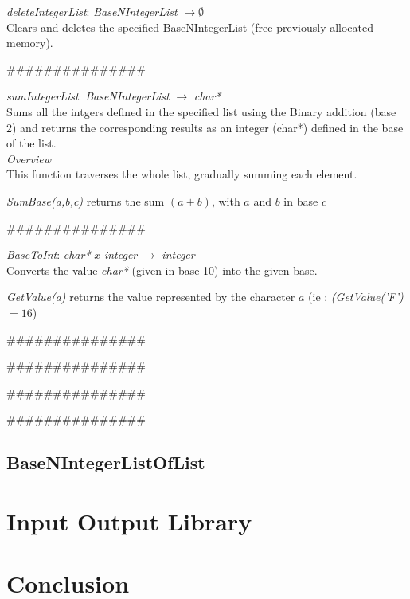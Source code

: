 \documentclass[book, backcover, english, report, nodocumentinfo]{upmethodology-document}
\newcommand{\nxtalgo}{\centerline{$$$$\#\#\#\#\#\#\#\#\#\#\#\#\#\#\#$$$$}}
\newcommand{\ov}{\emph{Overview}}
\begin{document}
		\begin{minipage}{\linewidth}
			\emph{deleteIntegerList}: \emph{BaseNIntegerList} \(\rightarrow \emptyset\)\\
				Clears and deletes the specified BaseNIntegerList (free previously allocated memory).\\
			\label{algo:BNIL-DeleteIntegerList}
			
		\end{minipage}
		\nxtalgo

		\begin{minipage}{\linewidth}
			\emph{sumIntegerList}: \emph{BaseNIntegerList} \(\rightarrow\) \emph{char*}\\
				Sums all the intgers defined in the specified list using the Binary addition (base 2)
				and returns the corresponding results as an integer (char*) defined in the base of the list.\\
			\ov\\
			This function traverses the whole list, gradually summing each element.
			\label{algo:BNIL-SumIntegerList}
			
			\emph{SumBase(a,b,c)} returns the sum \((a+b)\), with \(a\) and \(b\) in base \(c\)
		\end{minipage}
		\nxtalgo

		\begin{minipage}{\linewidth}
			\emph{BaseToInt}: \emph{char*} \(x\) \emph{integer} \(\rightarrow\) \emph{integer}\\
				Converts the value \emph{char*} (given in base 10) into the given base.
			\label{algo:BNIL-BaseToInt}
			
			\emph{GetValue(a)} returns the value represented by the character \(a\)
			(ie : \emph{(GetValue('F')} \(= 16\))
		\end{minipage}
		\nxtalgo

		\begin{minipage}{\linewidth}
			\label{algo:BNIL-IntToBase}
			
		\end{minipage}
		\nxtalgo

		\begin{minipage}{\linewidth}
			\label{algo:BNIL-ConvertBaseToBinary}
			
		\end{minipage}
		\nxtalgo

		\begin{minipage}{\linewidth}
			\label{algo:BNIL-ConvertBinaryToBase}
			
		\end{minipage}
		\nxtalgo

		\begin{minipage}{\linewidth}
			\label{algo:BNIL-SumBase}
			
		\end{minipage}
	\section{BaseNIntegerListOfList}
\chapter{Input Output Library}
\chapter{Conclusion}
\end{document}
